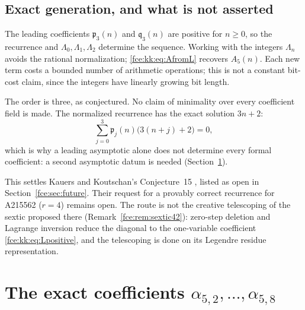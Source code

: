 \documentclass[11pt,a4paper]{article}
\numberwithin{equation}{section}
\theoremstyle{definition}\newtheorem{definition}[theorem]{Definition}
\theoremstyle{remark}\newtheorem{remark}[theorem]{Remark}
\begin{document}
\subsection{Exact generation, and what is not asserted}
The leading coefficients $\mathfrak p_3(n)$ and $\mathfrak q_3(n)$ are
positive for $n\ge0$, so the recurrence and $\Lambda_0,\Lambda_1,\Lambda_2$
determine the sequence. Working with the integers $\Lambda_n$ avoids the
rational normalization; \eqref{fce:kk:eq:AfromL} recovers $A_5(n)$. Each new
term costs a bounded number of arithmetic operations; this is not a
constant bit-cost claim, since the integers have linearly growing bit
length.

The order is three, as conjectured. No claim of minimality over every
coefficient field is made. The normalized recurrence has the exact
solution $3n+2$:
\begin{equation}\label{fce:kk:eq:linearsolution}
 \sum_{j=0}^3\mathfrak p_j(n)\bigl(3(n+j)+2\bigr)=0,
\end{equation}
which is why a leading asymptotic alone does not determine every formal
coefficient: a second asymptotic datum is needed
(Section~\ref{fce:kk:sec:coefficients}).

This settles Kauers and Koutschan's Conjecture~15 \cite{kk}, listed as
open in Section~\ref{fce:sec:future}. Their request for a provably correct
recurrence for A215562 ($r=4$) remains open. The route is not the creative
telescoping of the sextic proposed there (Remark~\ref{fce:rem:sextic42}):
zero-step deletion and Lagrange inversion reduce the diagonal to the
one-variable coefficient \eqref{fce:kk:eq:Lpositive}, and the telescoping
is done on its Legendre residue representation.

\section{The exact coefficients \texorpdfstring{$\alpha_{5,2},\ldots,\alpha_{5,8}$}{alpha(5,2),...,alpha(5,8)}}\label{fce:kk:sec:coefficients}
\end{document}
